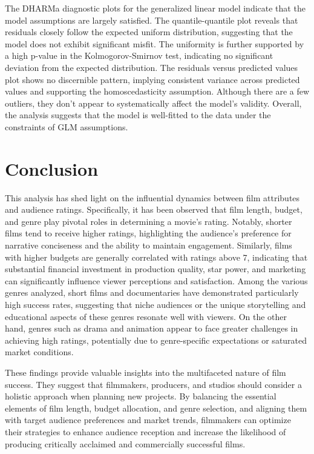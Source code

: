 \documentclass[
  11pt,
]{article}
\begin{document}
The DHARMa diagnostic plots for the generalized linear model indicate
that the model assumptions are largely satisfied. The quantile-quantile
plot reveals that residuals closely follow the expected uniform
distribution, suggesting that the model does not exhibit significant
misfit. The uniformity is further supported by a high p-value in the
Kolmogorov-Smirnov test, indicating no significant deviation from the
expected distribution. The residuals versus predicted values plot shows
no discernible pattern, implying consistent variance across predicted
values and supporting the homoscedasticity assumption. Although there
are a few outliers, they don't appear to systematically affect the
model's validity. Overall, the analysis suggests that the model is
well-fitted to the data under the constraints of GLM assumptions.

\hypertarget{conclusion}{%
\section{Conclusion}\label{conclusion}}

This analysis has shed light on the influential dynamics between film
attributes and audience ratings. Specifically, it has been observed that
film length, budget, and genre play pivotal roles in determining a
movie's rating. Notably, shorter films tend to receive higher ratings,
highlighting the audience's preference for narrative conciseness and the
ability to maintain engagement. Similarly, films with higher budgets are
generally correlated with ratings above 7, indicating that substantial
financial investment in production quality, star power, and marketing
can significantly influence viewer perceptions and satisfaction. Among
the various genres analyzed, short films and documentaries have
demonstrated particularly high success rates, suggesting that niche
audiences or the unique storytelling and educational aspects of these
genres resonate well with viewers. On the other hand, genres such as
drama and animation appear to face greater challenges in achieving high
ratings, potentially due to genre-specific expectations or saturated
market conditions.

These findings provide valuable insights into the multifaceted nature of
film success. They suggest that filmmakers, producers, and studios
should consider a holistic approach when planning new projects. By
balancing the essential elements of film length, budget allocation, and
genre selection, and aligning them with target audience preferences and
market trends, filmmakers can optimize their strategies to enhance
audience reception and increase the likelihood of producing critically
acclaimed and commercially successful films.
\end{document}

